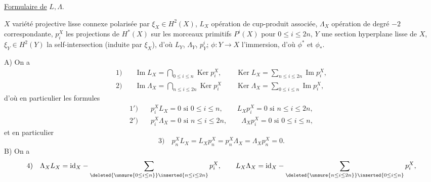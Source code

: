 \uline{Formulaire de} $L,\Lambda$.

$X$ variété projective lisse connexe polarisée par $\xi_X\in H^2(X)$, $L_X$ opération de cup-produit associée, $\Lambda_X$ opération de degré $-2$ correspondante, $p_i^X$ les projections de $H^*(X)$ sur les morceaux primitifs $P^i(X)$ pour $0\leq i\leq2n$, $Y$ une section hyperplane lisse de $X$, $\xi_Y\in H^2(Y)$ la self-intersection (induite par $\xi_X$), d'où $L_Y$, $\Lambda_Y$, $p_Y^i$; $\phi:Y\to X$ l'immersion, d'où $\phi^*$ et $\phi_*$.

A) On a
\[
\begin{aligned}
1)\quad&\operatorname{Im}L_X=\bigcap_{0\leq i\leq n}\operatorname{Ker}p_i^X,\qquad
\operatorname{Ker}L_X=\sum_{n\leq i\leq2n}\operatorname{Im}p_i^X,\\
2)\quad&\operatorname{Im}\Lambda_X=\bigcap_{n\leq i\leq2n}\operatorname{Ker}p_i^X\qquad
\operatorname{Ker}\Lambda_X=\sum_{0\leq i\leq n}\operatorname{Im}p_i^X,
\end{aligned}
\]
d'où en particulier les formules
\[
\begin{aligned}
1')\quad&p_i^XL_X=0\text{ si }0\leq i\leq n,\qquad L_Xp_i^X=0\text{ si }n\leq i\leq2n,\\
2')\quad&p_i^X\Lambda_X=0\text{ si }n\leq i\leq2n,\qquad\Lambda_Xp_i^X=0\text{ si }0\leq i\leq n,
\end{aligned}
\]
et en particulier
\[
3)\quad p_n^XL_X=L_Xp_n^X=p_n^X\Lambda_X=\Lambda_Xp_n^X=0.
\]
B) On a
\[
4)\quad\Lambda_XL_X=\mathrm{id}_X-\sum_{\deleted{\unsure{0\leq i\leq n}}\inserted{n\leq i\leq2n}}p_i^X,
\qquad L_X\Lambda_X=\mathrm{id}_X-\sum_{\deleted{\unsure{n\leq i\leq2n}}\inserted{0\leq i\leq n}}p_i^X,
\]


